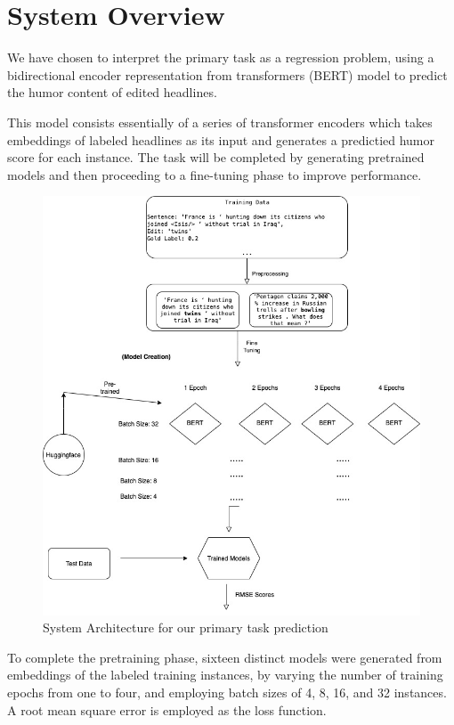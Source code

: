 \documentclass{article}
\begin{document}
\section{System Overview}

We have chosen to interpret the primary task as a regression problem, using a bidirectional encoder representation from transformers (BERT) model to predict the humor content of edited headlines.

This model \cite{DBLP:journals/corr/abs-1810-04805} consists essentially of a series of transformer encoders which takes embeddings of labeled headlines as its input and generates a predictied humor score for each instance. The task will be completed by generating pretrained models and then proceeding to a fine-tuning phase to improve performance.

\begin{figure}
\includegraphics[scale=0.25]{classifier.jpg}
\caption{System Architecture for our primary task prediction}
\end{figure}

To complete the pretraining phase, sixteen distinct models were generated from embeddings of the labeled training instances, by varying the number of training epochs from one to four, and employing batch sizes of 4, 8, 16, and 32 instances. A root mean square error is employed as the loss function.
\end{document}
